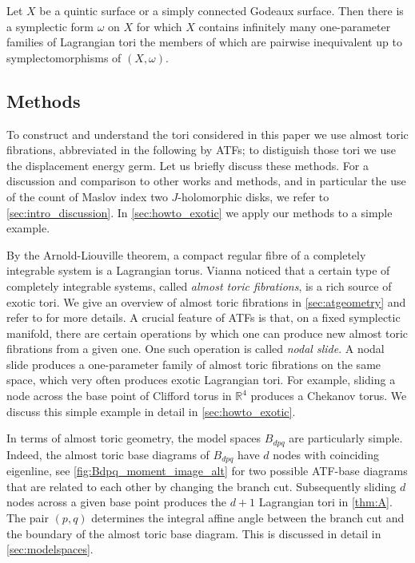 \documentclass[12pt,a4paper,abstract=true,final]{scrartcl}
\begin{document}
\begin{corollary}
    \label{thm:quinticgodeaux}
    Let $X$ be a quintic surface or a simply connected Godeaux surface.
Then there is a symplectic form $\omega$ on $X$ for which $X$ contains infinitely many one-parameter families of Lagrangian tori the members of which are pairwise inequivalent up to symplectomorphisms of $(X,\omega)$.
\end{corollary}

\subsection{Methods}
\label{sec:intro_methods}

To construct and understand the tori considered in this paper we use almost toric fibrations, abbreviated in the following by ATFs; to distiguish those tori we use the displacement energy germ.
Let us briefly discuss these methods.
For a discussion and comparison to other works and methods, and in particular the use of the count of Maslov index two $J$-holomorphic disks, we refer to \cref{sec:intro_discussion}.
In \cref{sec:howto_exotic} we apply our methods to a simple example.

By the Arnold-Liouville theorem, a compact regular fibre of a completely integrable system is a Lagrangian torus. Vianna \cite{Via16,Via17} noticed that a certain type of completely integrable systems, called \emph{almost toric fibrations}, is a rich source of exotic tori. We give an overview of almost toric fibrations in \cref{sec:atgeometry} and refer to \cite{evans2021atfs} for more details. A crucial feature of ATFs is that, on a fixed symplectic manifold, there are certain operations by which one can produce new almost toric fibrations from a given one. One such operation is called \emph{nodal slide}. A nodal slide produces a one-parameter family of almost toric fibrations on the same space, which very often produces exotic Lagrangian tori. For example, sliding a node across the base point of Clifford torus in $\mathbb{R}^4$ produces a Chekanov torus. We discuss this simple example in detail in \cref{sec:howto_exotic}.

In terms of almost toric geometry, the model spaces $B_{dpq}$ are particularly simple.
Indeed, the almost toric base diagrams of $B_{dpq}$ have $d$ nodes with coinciding eigenline, see \cref{fig:Bdpq_moment_image_alt} for two possible ATF-base diagrams that are related to each other by changing the branch cut. Subsequently sliding $d$ nodes across a given base point produces the $d+1$ Lagrangian tori in \cref{thm:A}.
The pair $(p,q)$ determines the integral affine angle between the branch cut and the boundary of the almost toric base diagram.
This is discussed in detail in \cref{sec:modelspaces}.
\end{document}
